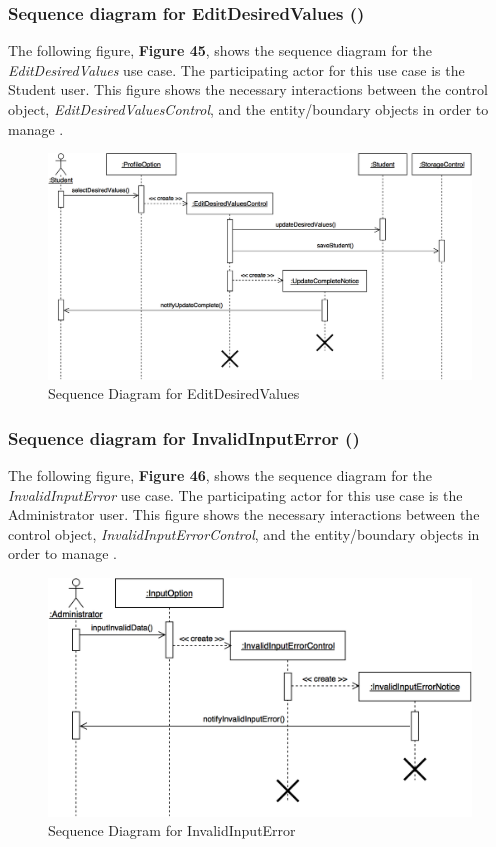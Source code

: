 \documentclass[12pt,letterpaper]{article}
\begin{document}
\subsubsection*{Sequence diagram for EditDesiredValues (\editdesiredvalues{})}

The following figure, {\bf Figure 45}, shows the sequence diagram for the {\it EditDesiredValues} use case. The participating actor for this use case is
the Student user. This figure shows the necessary interactions between the control object, {\it EditDesiredValuesControl}, and the
entity/boundary objects in order to manage \editdesiredvalues{}.

\begin{figure}[H]
	\centering{}
	\includegraphics[scale=0.3]{imgs/seq/edit-desired-values.png}
	\caption{Sequence Diagram for EditDesiredValues}
\end{figure}

\subsubsection*{Sequence diagram for InvalidInputError (\invalidinputerror{})}

The following figure, {\bf Figure 46}, shows the sequence diagram for the {\it InvalidInputError} use case. The participating actor for this use case is
the Administrator user. This figure shows the necessary interactions between the control object, {\it InvalidInputErrorControl}, and the
entity/boundary objects in order to manage \invalidinputerror{}.

\begin{figure}[H]
	\centering{}
	\includegraphics[scale=0.3]{imgs/seq/invalid-input-error.png}
	\caption{Sequence Diagram for InvalidInputError}
\end{figure}
\end{document}
